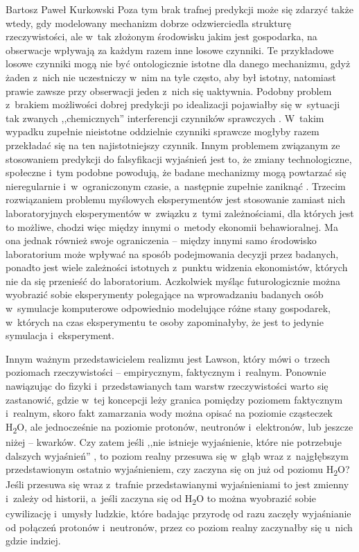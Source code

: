 \begin{artplenv}{Bartosz Paweł Kurkowski}
Poza tym brak trafnej predykcji może się zdarzyć także wtedy, gdy
modelowany mechanizm dobrze odzwierciedla strukturę rzeczywistości, ale w~tak złożonym środowisku jakim jest
gospodarka, na obserwacje wpływają za każdym razem inne losowe czynniki. Te przykładowe losowe czynniki mogą nie być
ontologicznie istotne dla danego mechanizmu, gdyż żaden z~nich nie uczestniczy w~nim na tyle często, aby był istotny,
natomiast prawie zawsze przy obserwacji jeden z~nich się uaktywnia. Podobny problem z~brakiem możliwości dobrej
predykcji po idealizacji pojawiałby się w~sytuacji tak zwanych ,,chemicznych'' interferencji czynników sprawczych
\parencite[s.~89]{hardt_studia_2013}.
W~takim wypadku zupełnie nieistotne oddzielnie czynniki sprawcze mogłyby
razem przekładać się na ten najistotniejszy czynnik. Innym problemem związanym ze stosowaniem predykcji do falsyfikacji
wyjaśnień jest to, że zmiany technologiczne, społeczne i~tym podobne powodują, że badane mechanizmy mogą powtarzać się
nieregularnie i~w~ograniczonym czasie, a~następnie zupełnie zaniknąć
\parencites[s.~116]{hardt_studia_2013}[s.~271]{gorazda_filozofia_2014}.
Trzecim rozwiązaniem problemu myślowych eksperymentów jest stosowanie zamiast nich
laboratoryjnych eksperymentów w~związku z~tymi zależnościami, dla których jest to możliwe, chodzi więc między
innymi o~metody ekonomii behawioralnej. Ma ona jednak również swoje ograniczenia -- między innymi samo środowisko laboratorium
może wpływać na sposób podejmowania decyzji przez badanych, ponadto jest wiele zależności istotnych z~punktu widzenia
ekonomistów, których nie da się przenieść do laboratorium. Aczkolwiek myśląc futurologicznie można wyobrazić sobie
eksperymenty polegające na wprowadzaniu badanych osób w~symulacje komputerowe odpowiednio modelujące różne stany
gospodarek, w~których na czas eksperymentu te osoby zapominałyby, że jest to jedynie symulacja i~eksperyment.


Innym ważnym przedstawicielem realizmu jest Lawson, który mówi o~trzech poziomach rzeczywistości -- empirycznym,
faktycznym i~realnym. Ponownie nawiązując do fizyki i~przedstawianych tam warstw rzeczywistości warto się zastanowić,
gdzie w~tej koncepcji leży granica pomiędzy poziomem faktycznym i~realnym, skoro fakt zamarzania wody można opisać na
poziomie cząsteczek H\textsubscript{2}O, ale jednocześnie na poziomie protonów, neutronów i~elektronów, lub jeszcze
niżej -- kwarków. Czy zatem jeśli ,,nie istnieje wyjaśnienie, które nie potrzebuje dalszych wyjaśnień''
\parencite[s.~235]{popper_cel_2002},
to poziom realny przesuwa się w~głąb wraz z~najgłębszym przedstawionym
ostatnio wyjaśnieniem, czy zaczyna się on już od poziomu H\textsubscript{2}O? Jeśli przesuwa się wraz z~trafnie
przedstawianymi wyjaśnieniami to jest zmienny i~zależy od historii, a~jeśli zaczyna się od H\textsubscript{2}O to można
wyobrazić sobie cywilizację i~umysły ludzkie, które badając przyrodę od razu zaczęły wyjaśnianie od połączeń
protonów i~neutronów, przez co poziom realny zaczynałby się u~nich gdzie indziej.



\end{artplenv}
